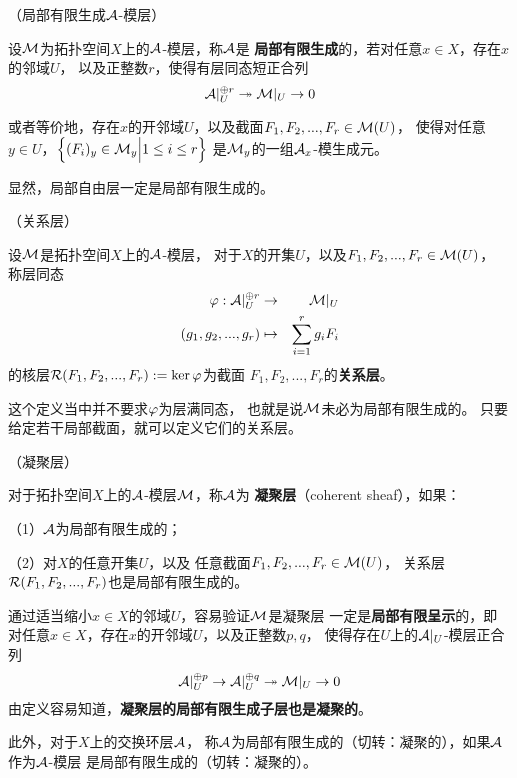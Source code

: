 \begin{definition}（局部有限生成$\mathcal{A}$-模层）

设$\mathcal{M}$为拓扑空间$X$上的$\mathcal{A}$-模层，称$\mathcal{A}$是
\textbf{局部有限生成}的，若对任意$x\in X$，存在$x$的邻域$U$，
以及正整数$r$，使得有层同态短正合列
$$\mathcal{A}|_U^{\oplus r}\twoheadrightarrow\mathcal{M}|_U\to 0$$
\end{definition}

或者等价地，存在$x$的开邻域$U$，以及截面$F_1,F_2,...,F_r\in\mathcal{M}(U)$，
使得对任意$y\in U$，$\Big\{ (F_i)_y\in\mathcal{M}_y \Big| 1\leq i\leq r \Big\}$
是$\mathcal{M}_y$的一组$\mathcal{A}_x$-模生成元。

显然，局部自由层一定是局部有限生成的。

\begin{definition}（关系层）

设$\mathcal{M}$是拓扑空间$X$上的$\mathcal{A}$-模层，
对于$X$的开集$U$，以及$F_1,F_2,...,F_r\in\mathcal{M}(U)$，
称层同态
\begin{eqnarray*}
     \varphi:\mathcal{A}|_U^{\oplus r} &\to&  \mathcal{M}|_{U}\\
     (g_1,g_2,...,g_{r})&\mapsto&\sum_{i=1}^{r}g_iF_i
\end{eqnarray*}
的核层$\mathcal{R}(F_1,F_2,...,F_r):=\ker\varphi$为截面
$F_1,F_2,...,F_r$的\textbf{关系层}。
\end{definition}
这个定义当中并不要求$\varphi$为层满同态，
也就是说$\mathcal{M}$未必为局部有限生成的。
只要给定若干局部截面，就可以定义它们的关系层。

\begin{definition}（凝聚层）

对于拓扑空间$X$上的$\mathcal{A}$-模层$\mathcal{M}$，称$\mathcal{A}$为
\textbf{凝聚层}（coherent sheaf），如果：

（1）$\mathcal{A}$为局部有限生成的；

（2）对$X$的任意开集$U$，以及
任意截面$F_1,F_2,...,F_r\in\mathcal{M}(U)$，
关系层$\mathcal{R}(F_1,F_2,...,F_r)$也是局部有限生成的。
\end{definition}

通过适当缩小$x\in X$的邻域$U$，容易验证$\mathcal{M}$是凝聚层
一定是\textbf{局部有限呈示}的，即
对任意$x\in X$，存在$x$的开邻域$U$，以及正整数$p,q$，
使得存在$U$上的$\mathcal{A}|_U$-模层正合列
$$
  \mathcal{A}|_U^{\oplus p}\to
  \mathcal{A}|_U^{\oplus q}\twoheadrightarrow
  \mathcal{M}|_U\to 0
$$
由定义容易知道，\textbf{凝聚层的局部有限生成子层也是凝聚的}。

此外，对于$X$上的交换环层$\mathcal{A}$，
称$\mathcal{A}$为局部有限生成的（切转：凝聚的），如果$\mathcal{A}$作为$\mathcal{A}$-模层
是局部有限生成的（切转：凝聚的）。

